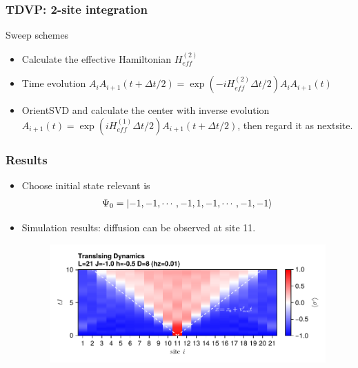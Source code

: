 \documentclass{beamer}
\begin{document}
\begin{frame}
	\frametitle{TDVP: 2-site integration}
	Sweep schemes
	\begin{itemize}
		\item Calculate the effective Hamiltonian $H_{eff}^{(2)}$
		\item Time evolution $A_iA_{i+1}(t+\Delta t/2) = \exp(-iH_{eff}^{(2)}\Delta t / 2)A_iA_{i+1}(t)$ 
		\item OrientSVD and calculate the center with inverse evolution $A_{i+1}(t) = \exp(iH_{eff}^{(1)}\Delta t /2) A_{i+1}(t+\Delta t/2)$, then regard it as nextsite.
		\begin{figure}[H]
			\centering
			\subfigbottomskip=2pt
			\subfigcapskip=-5pt
		\end{figure}
	\end{itemize}
\end{frame}

\begin{frame}
	\frametitle{Results}
	\begin{itemize}
		\item Choose initial state relevant is
		\begin{gather}
			\Psi_0 = \ket{-1,-1,\cdots,-1,1,-1,\cdots,-1,-1}
		\end{gather}
		\item Simulation results: diffusion can be observed at site 11.
		\begin{figure}[H]
			\includegraphics[width=0.85 \linewidth]{images/Impur_Mi_D=8_L=21_J=-1.0_t=10.pdf}
		\end{figure}
	\end{itemize}
\end{frame}
\end{document}
